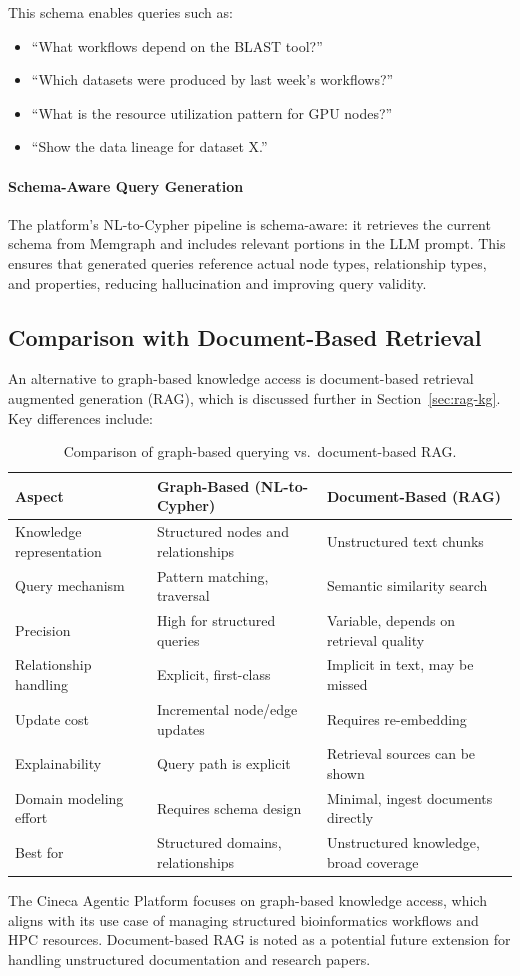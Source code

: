 This schema enables queries such as:
\begin{itemize}
    \item ``What workflows depend on the BLAST tool?''
    \item ``Which datasets were produced by last week's workflows?''
    \item ``What is the resource utilization pattern for GPU nodes?''
    \item ``Show the data lineage for dataset X.''
\end{itemize}

\paragraph{Schema-Aware Query Generation}

The platform's NL-to-Cypher pipeline is schema-aware: it retrieves the current schema from Memgraph and includes relevant portions in the LLM prompt. This ensures that generated queries reference actual node types, relationship types, and properties, reducing hallucination and improving query validity.

\subsection{Comparison with Document-Based Retrieval}

An alternative to graph-based knowledge access is document-based retrieval augmented generation (RAG), which is discussed further in Section~\ref{sec:rag-kg}. Key differences include:

\begin{table}[ht]
\centering
\caption{Comparison of graph-based querying vs.\ document-based RAG.}
\label{tab:graph-vs-rag}
\small
\begin{tabular}{lp{5.5cm}p{5.5cm}}
\hline
\textbf{Aspect} & \textbf{Graph-Based (NL-to-Cypher)} & \textbf{Document-Based (RAG)} \\
\hline
Knowledge representation & Structured nodes and relationships & Unstructured text chunks \\
Query mechanism & Pattern matching, traversal & Semantic similarity search \\
Precision & High for structured queries & Variable, depends on retrieval quality \\
Relationship handling & Explicit, first-class & Implicit in text, may be missed \\
Update cost & Incremental node/edge updates & Requires re-embedding \\
Explainability & Query path is explicit & Retrieval sources can be shown \\
Domain modeling effort & Requires schema design & Minimal, ingest documents directly \\
Best for & Structured domains, relationships & Unstructured knowledge, broad coverage \\
\hline
\end{tabular}
\end{table}

The Cineca Agentic Platform focuses on graph-based knowledge access, which aligns with its use case of managing structured bioinformatics workflows and HPC resources. Document-based RAG is noted as a potential future extension for handling unstructured documentation and research papers.

